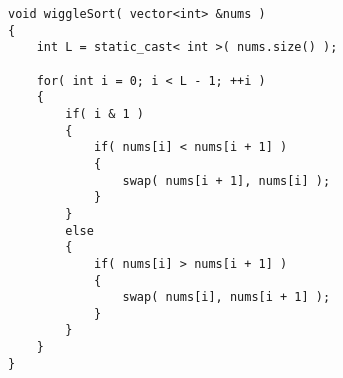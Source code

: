 \setcounter{lstlisting}{0}
\begin{lstlisting}[style=customc, caption={Swap Inline}]
void wiggleSort( vector<int> &nums )
{
    int L = static_cast< int >( nums.size() );

    for( int i = 0; i < L - 1; ++i )
    {
        if( i & 1 )
        {
            if( nums[i] < nums[i + 1] )
            {
                swap( nums[i + 1], nums[i] );
            }
        }
        else
        {
            if( nums[i] > nums[i + 1] )
            {
                swap( nums[i], nums[i + 1] );
            }
        }
    }
}
\end{lstlisting}
